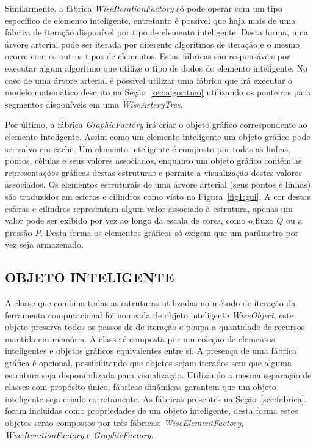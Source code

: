 Similarmente, a fábrica \textit{WiseIterationFactory} só pode operar com um tipo específico de elemento inteligente, entretanto é possível que haja mais de uma fábrica de iteração disponível por tipo de elemento inteligente. Desta forma, uma árvore arterial pode ser iterada por diferente algoritmos de iteração e o mesmo ocorre com os outros tipos de elementos. Estas fábricas são responsáveis por executar algum algoritmo que utilize o tipo de dados do elemento inteligente. No caso de uma árvore arterial é possível utilizar uma fábrica que irá executar o modelo matemático descrito na Seção~\ref{sec:algoritmo} utilizando os ponteiros para segmentos disponíveis em uma \textit{WiseArteryTree}.

Por último, a fábrica \textit{GraphicFactory} irá criar o objeto gráfico correspondente ao elemento inteligente. Assim como um elemento inteligente um objeto gráfico pode ser salvo em cache.  Um elemento inteligente é composto por todas as linhas, pontos, células e seus valores associados, enquanto um objeto gráfico contém as representações gráficas destas estruturas e permite a visualização destes valores associados. Os elementos estruturais de uma árvore arterial (seus pontos e linhas) são traduzidos em esferas e cilindros como visto na Figura~\ref{fig1:gui}. A cor destas esferas e cilindros representam algum valor associado à estrutura, apenas um valor pode ser exibido por vez ao longo da escala de cores, como o fluxo $Q$ ou a pressão $P$. Desta forma os elementos gráficos só exigem que um parâmetro por vez seja armazenado.


\subsection{OBJETO INTELIGENTE}\label{sec:objeto_inteligente}

A classe que combina todas as estruturas utilizadas no método de iteração da ferramenta computacional foi nomeada de objeto inteligente \textit{WiseObject}, este objeto preserva todos os passos de de iteração e poupa a quantidade de recursos mantida em memória. A classe é composta por um coleção de elementos inteligentes e objetos gráficos equivalentes entre si. A presença de uma fábrica gráfica é opcional, possibilitando que objetos sejam iterados sem que alguma estrutura seja disponibilizada para visualização. Utilizando a mesma separação de classes com propósito único, fábricas dinâmicas garantem que um objeto inteligente seja criado corretamente. As fábricas presentes na Seção~\ref{sec:fabrica} foram incluídas como propriedades de um objeto inteligente, desta forma estes objetos serão compostos por três fábricas: \textit{WiseElementFactory}, \textit{WiseIterationFactory} e \textit{GraphicFactory}.

